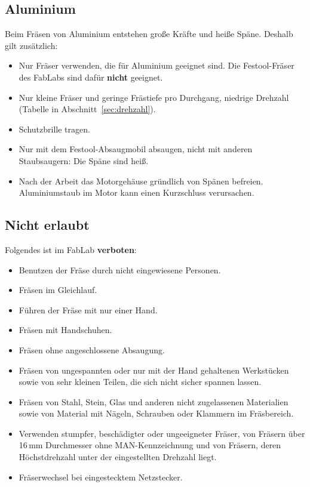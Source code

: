 \documentclass{\basedir/fablab-document}
\begin{document}
	\subsection{Aluminium}
	\label{sec:aluminium}
	Beim Fräsen von Aluminium entstehen große Kräfte und heiße Späne. Deshalb gilt zusätzlich:
	\begin{itemize}
		\item Nur Fräser verwenden, die für Aluminium geeignet sind. Die Festool-Fräser des FabLabs sind dafür \textbf{nicht} geeignet.
		\item Nur kleine Fräser und geringe Frästiefe pro Durchgang, niedrige Drehzahl (Tabelle in Abschnitt~\ref{sec:drehzahl}).
		\item Schutzbrille tragen.
		\item Nur mit dem Festool-Absaugmobil absaugen, nicht mit anderen Staubsaugern: Die Späne sind heiß.
		\item Nach der Arbeit das Motorgehäuse gründlich von Spänen befreien. Aluminiumstaub im Motor kann einen Kurzschluss verursachen.
	\end{itemize}

	\subsection{Nicht erlaubt}
	Folgendes ist im FabLab \textbf{verboten}:
	\begin{itemize}
		\item Benutzen der Fräse durch nicht eingewiesene Personen.
		\item Fräsen im Gleichlauf.
		\item Führen der Fräse mit nur einer Hand.
		\item Fräsen mit Handschuhen.
		\item Fräsen ohne angeschlossene Absaugung.
		\item Fräsen von ungespannten oder nur mit der Hand gehaltenen Werkstücken sowie von sehr kleinen Teilen, die sich nicht sicher spannen lassen.
		\item Fräsen von Stahl, Stein, Glas und anderen nicht zugelassenen Materialien sowie von Material mit Nägeln, Schrauben oder Klammern im Fräsbereich.
		\item Verwenden stumpfer, beschädigter oder ungeeigneter Fräser, von Fräsern über 16\,mm Durchmesser ohne MAN-Kennzeichnung und von Fräsern, deren Höchstdrehzahl unter der eingestellten Drehzahl liegt.
		\item Fräserwechsel bei eingestecktem Netzstecker.
	\end{itemize}
\end{document}
